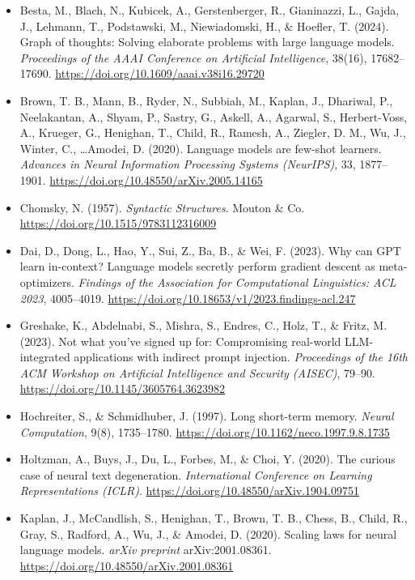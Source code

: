 \begin{itemize}[leftmargin=1.5em, label={}, itemsep=0.22ex, parsep=0pt]
\small\raggedright
{}
    \item Besta, M., Blach, N., Kubicek, A., Gerstenberger, R., Gianinazzi, L., Gajda, J., Lehmann, T., Podstawski, M., Niewiadomski, H., \& Hoefler, T. (2024). Graph of thoughts: Solving elaborate problems with large language models. \textit{Proceedings of the AAAI Conference on Artificial Intelligence}, 38(16), 17682--17690. \url{https://doi.org/10.1609/aaai.v38i16.29720}
    \item Brown, T. B., Mann, B., Ryder, N., Subbiah, M., Kaplan, J., Dhariwal, P., Neelakantan, A., Shyam, P., Sastry, G., Askell, A., Agarwal, S., Herbert-Voss, A., Krueger, G., Henighan, T., Child, R., Ramesh, A., Ziegler, D. M., Wu, J., Winter, C., \dots Amodei, D. (2020). Language models are few-shot learners. \textit{Advances in Neural Information Processing Systems (NeurIPS)}, 33, 1877--1901. \url{https://doi.org/10.48550/arXiv.2005.14165}
    \item Chomsky, N. (1957). \textit{Syntactic Structures}. Mouton \& Co. \url{https://doi.org/10.1515/9783112316009}
    \item Dai, D., Dong, L., Hao, Y., Sui, Z., Ba, B., \& Wei, F. (2023). Why can GPT learn in-context? Language models secretly perform gradient descent as meta-optimizers. \textit{Findings of the Association for Computational Linguistics: ACL 2023}, 4005--4019. \url{https://doi.org/10.18653/v1/2023.findings-acl.247}
    \item Greshake, K., Abdelnabi, S., Mishra, S., Endres, C., Holz, T., \& Fritz, M. (2023). Not what you've signed up for: Compromising real-world LLM-integrated applications with indirect prompt injection. \textit{Proceedings of the 16th ACM Workshop on Artificial Intelligence and Security (AISEC)}, 79--90. \url{https://doi.org/10.1145/3605764.3623982}
    \item Hochreiter, S., \& Schmidhuber, J. (1997). Long short-term memory. \textit{Neural Computation}, 9(8), 1735--1780. \url{https://doi.org/10.1162/neco.1997.9.8.1735}
    \item Holtzman, A., Buys, J., Du, L., Forbes, M., \& Choi, Y. (2020). The curious case of neural text degeneration. \textit{International Conference on Learning Representations (ICLR)}. \url{https://doi.org/10.48550/arXiv.1904.09751}
    \item Kaplan, J., McCandlish, S., Henighan, T., Brown, T. B., Chess, B., Child, R., Gray, S., Radford, A., Wu, J., \& Amodei, D. (2020). Scaling laws for neural language models. \textit{arXiv preprint} arXiv:2001.08361. \url{https://doi.org/10.48550/arXiv.2001.08361}

\end{itemize}
